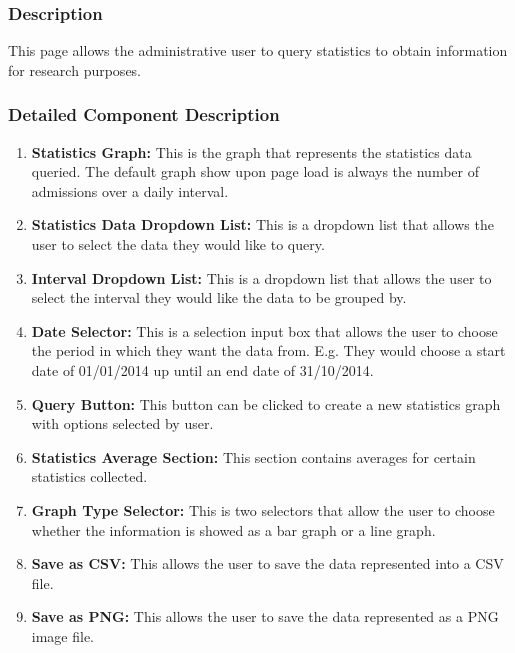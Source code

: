 \documentclass[14pt, a4paper]{article}
\begin{document}
\subsubsection{Description} This page allows the administrative user to query statistics to obtain information for research purposes.
\subsubsection{Detailed Component Description}
\begin{enumerate}
\item \textbf{Statistics Graph:} This is the graph that represents the statistics data queried. The default graph show upon page load is always the number of admissions over a daily interval. 
\item \textbf{Statistics Data Dropdown List:} This is a dropdown list that allows the user to select the data they would like to query.
\item \textbf{Interval Dropdown List:} This is a dropdown list that allows the user to select the interval they would like the data to be grouped by.
\item \textbf{Date Selector:} This is a selection input box that allows the user to choose the period in which they want the data from. E.g. They would choose a start date of 01/01/2014 up until an end date of 31/10/2014.
\item \textbf{Query Button:} This button can be clicked to create a new statistics graph with options selected by user.
\item \textbf{Statistics Average Section:} This section contains averages for certain statistics collected.
\item \textbf{Graph Type Selector: } This is two selectors that allow the user to choose whether the information is showed as a bar graph or a line graph.
\item \textbf{Save as CSV:} This allows the user to save the data represented into a CSV file.
\item \textbf{Save as PNG:} This allows the user to save the data represented as a PNG image file.
\end{enumerate}
\end{document}
